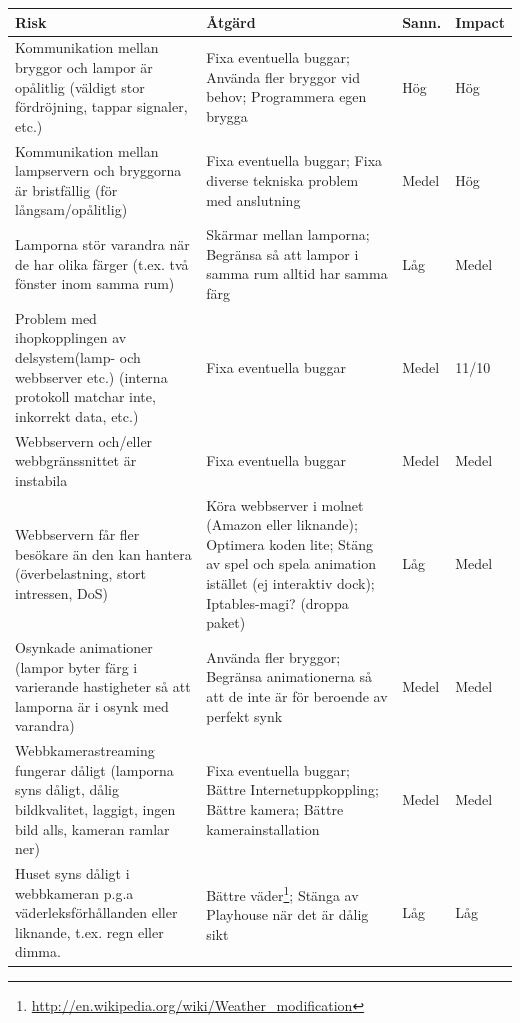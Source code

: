 \documentclass[a4paper,11pt]{article}
\begin{document}
  \begin{savenotes}
  \begin{tabular}{p{} p{} l l}

    {\bf Risk} & {\bf Åtgärd} & {\bf Sann.} & {\bf Impact} \\
    \hline
     Kommunikation mellan bryggor och lampor är opålitlig (väldigt stor
     fördröjning, tappar signaler, etc.) &
     Fixa eventuella buggar; Använda fler bryggor vid behov; Programmera egen
     brygga &
     Hög &
     Hög \\
     \hline

     Kommunikation mellan lampservern och bryggorna är bristfällig (för
     långsam/opålitlig) &
     Fixa eventuella buggar; Fixa diverse tekniska problem med anslutning &
     Medel &
     Hög \\
     \hline

     Lamporna stör varandra när de har olika färger (t.ex. två fönster inom
     samma rum) &
     Skärmar mellan lamporna; Begränsa så att lampor i samma rum alltid har
     samma färg &
     Låg &
     Medel \\
     \hline

     Problem med ihopkopplingen av delsystem(lamp- och webbserver etc.)
     (interna protokoll matchar inte, inkorrekt data, etc.) &
     Fixa eventuella buggar &
     Medel &
     11/10 \\
     \hline

     Webbservern och/eller webbgränssnittet är instabila &
     Fixa eventuella buggar &
     Medel &
     Medel \\
     \hline

     Webbservern får fler besökare än den kan hantera (överbelastning, stort
     intressen, DoS) &
     Köra webbserver i molnet (Amazon eller liknande); Optimera koden lite;
     Stäng av spel och spela animation istället (ej interaktiv dock);
     Iptables-magi? (droppa paket) &
     Låg &
     Medel \\
     \hline

     Osynkade animationer (lampor byter färg i varierande hastigheter så att
     lamporna är i osynk med varandra) &
     Använda fler bryggor; Begränsa animationerna så att de inte är för
     beroende av perfekt synk &
     Medel &
     Medel \\
     \hline

     Webbkamerastreaming fungerar dåligt (lamporna syns dåligt, dålig
     bildkvalitet, laggigt, ingen bild alls, kameran ramlar ner) &
     Fixa eventuella buggar; Bättre Internetuppkoppling; Bättre kamera; Bättre
     kamerainstallation &
     Medel &
     Medel \\
     \hline

     Huset syns dåligt i webbkameran p.g.a väderleksförhållanden eller
     liknande, t.ex. regn eller dimma. &
     Bättre väder\footnote{\url{http://en.wikipedia.org/wiki/Weather_modification}};
     Stänga av Playhouse när det är dålig sikt &
     Låg &
     Låg \\
     \hline

  \end{tabular}
  \end{savenotes}
\end{document}
